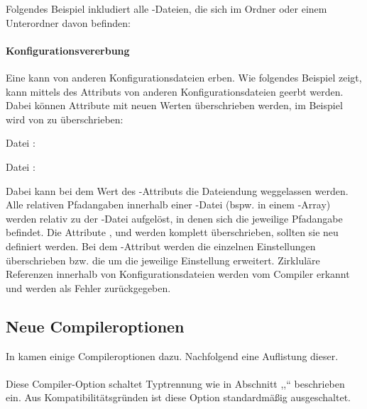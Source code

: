 Folgendes Beispiel inkludiert alle -Dateien, die sich im Ordner  oder einem Unterordner davon befinden:


\paragraph{Konfigurationsvererbung}
Eine \tsconfig kann von anderen Konfigurationsdateien erben. Wie folgendes Beispiel zeigt, kann mittels des Attributs  von anderen Konfigurationsdateien geerbt werden. Dabei können Attribute mit neuen Werten überschrieben werden, im Beispiel wird  von \tstrue zu \tsfalse überschrieben:

Datei :


Datei :


Dabei kann bei dem Wert des -Attributs die Dateiendung  weggelassen werden. Alle relativen Pfadangaben innerhalb einer \tsconfig-Datei (bspw. in einem -Array) werden relativ zu der \tsconfig-Datei aufgelöst, in denen sich die jeweilige Pfadangabe befindet.
Die Attribute ,  und  werden komplett überschrieben, sollten sie neu definiert werden. Bei dem -Attribut werden die einzelnen Einstellungen überschrieben bzw. die  um die jeweilige Einstellung erweitert. Zirkluläre Referenzen innerhalb von Konfigurationsdateien werden vom Compiler erkannt und werden als Fehler zurückgegeben.

\subsection{Neue Compileroptionen}
In  kamen einige Compileroptionen dazu. Nachfolgend eine Auflistung dieser.

\paragraph{}
Diese Compiler-Option schaltet Typtrennung wie in Abschnitt ,,`` beschrieben ein. Aus Kompatibilitätsgründen ist diese Option standardmäßig ausgeschaltet.

